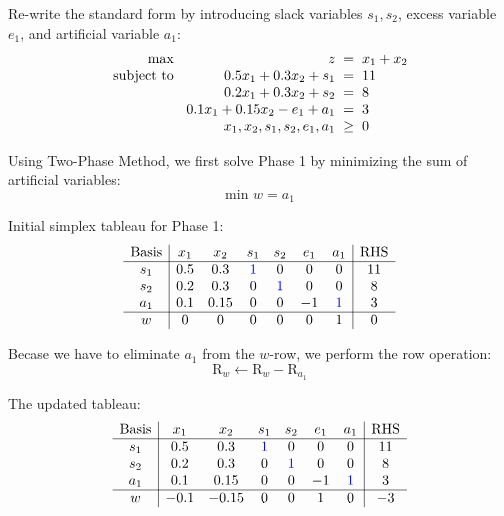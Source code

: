 \documentclass[a4paper, 10pt]{article}
\begin{document}
\begin{tosubmit}
\par\hspace{5mm} Re-write the standard form by introducing slack variables \( s_1, s_2 \), excess variable \( e_1 \), and artificial variable \( a_1 \):
\[
\begin{array}{@{\hspace{2mm}} r @{\hspace{2mm}} r @{\hspace{2mm}} c @{\hspace{2mm}} l}
    \text{max } & z & = & x_1 + x_2 \\
    \text{subject to } & 0.5x_1 + 0.3x_2 + s_1 & = & 11 \\
    & 0.2x_1 + 0.3x_2 + s_2 & = & 8 \\
    & 0.1x_1 + 0.15x_2 - e_1 + a_1 & = & 3 \\
    & x_1, x_2, s_1, s_2, e_1, a_1 & \geq & 0
\end{array}
\]

\par\hspace{5mm} Using Two-Phase Method, we first solve Phase 1 by minimizing the sum of artificial variables:
\[ \text{min } w = a_1 \]

Initial simplex tableau for Phase 1:
\[
\begin{array}{c|cccccc|c}
    \text{Basis} & x_1 & x_2 & s_1 & s_2 & e_1 & a_1 & \text{RHS} \\
    \hline
    s_1 & 0.5 & 0.3 & \textcolor[HTML]{0000FF}{1} & 0 & 0 & 0 & 11 \\
    s_2 & 0.2 & 0.3 & 0 & \textcolor[HTML]{0000FF}{1} & 0 & 0 & 8 \\
    a_1 & 0.1 & 0.15 & 0 & 0 & -1 & \textcolor[HTML]{0000FF}{1} & 3 \\
    \hline
    w & 0 & 0 & 0 & 0 & 0 & 1 & 0 \\
\end{array}
\]

\newpage

Becase we have to eliminate \( a_1 \) from the \( w \)-row, we perform the row operation:
\[ \text{R}_w \leftarrow \text{R}_w - \text{R}_{a_1} \]

The updated tableau:
\[
\begin{array}{c|cccccc|c}
    \text{Basis} & x_1 & x_2 & s_1 & s_2 & e_1 & a_1 & \text{RHS} \\
    \hline
    s_1 & 0.5 & 0.3 & \textcolor[HTML]{0000FF}{1} & 0 & 0 & 0 & 11 \\
    s_2 & 0.2 & 0.3 & 0 & \textcolor[HTML]{0000FF}{1} & 0 & 0 & 8 \\
    a_1 & 0.1 & 0.15 & 0 & 0 & -1 & \textcolor[HTML]{0000FF}{1} & 3 \\
    \hline
    w & -0.1 & -0.15 & 0 & 0 & 1 & 0 & -3 \\
\end{array}
\]


\end{tosubmit}
\end{document}
